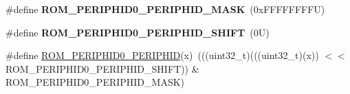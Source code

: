 \begin{DoxyCompactItemize}
\mbox{\label{group___m_t_b___register___masks_ga2dfed5a6af54f8d29e984653d14a2d1a}} 
\#define {\bfseries R\+O\+M\+\_\+\+P\+E\+R\+I\+P\+H\+I\+D0\+\_\+\+P\+E\+R\+I\+P\+H\+I\+D\+\_\+\+M\+A\+SK}~(0x\+F\+F\+F\+F\+F\+F\+F\+F\+U)
\item 
\mbox{\label{group___m_t_b___register___masks_gaacd7e0172c630fb56d8d465c16111feb}} 
\#define {\bfseries R\+O\+M\+\_\+\+P\+E\+R\+I\+P\+H\+I\+D0\+\_\+\+P\+E\+R\+I\+P\+H\+I\+D\+\_\+\+S\+H\+I\+FT}~(0\+U)
\item 
\#define \mbox{\hyperlink{group___m_t_b___register___masks_ga4e81784ff5ff7bb04e70159467a44e6f}{R\+O\+M\+\_\+\+P\+E\+R\+I\+P\+H\+I\+D0\+\_\+\+P\+E\+R\+I\+P\+H\+ID}}(x)~(((uint32\+\_\+t)(((uint32\+\_\+t)(x)) $<$$<$ R\+O\+M\+\_\+\+P\+E\+R\+I\+P\+H\+I\+D0\+\_\+\+P\+E\+R\+I\+P\+H\+I\+D\+\_\+\+S\+H\+I\+FT)) \& R\+O\+M\+\_\+\+P\+E\+R\+I\+P\+H\+I\+D0\+\_\+\+P\+E\+R\+I\+P\+H\+I\+D\+\_\+\+M\+A\+SK)
\end{DoxyCompactItemize}
